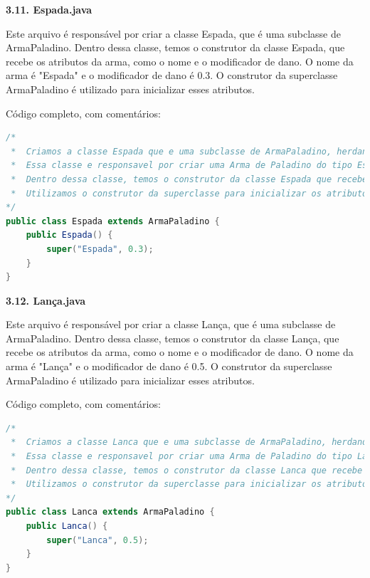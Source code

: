 \documentclass[11pt]{uiobrev}
\begin{document}
\vspace{0.5cm}
\Large \textbf{3.11. Espada.java}

Este arquivo é responsável por criar a classe Espada, que é uma subclasse de ArmaPaladino. Dentro dessa classe, temos o construtor da classe Espada, que recebe os atributos da arma, como o nome e o modificador de dano. O nome da arma é "Espada" e o modificador de dano é 0.3. O construtor da superclasse ArmaPaladino é utilizado para inicializar esses atributos.

Código completo, com comentários: 

\begin{lstlisting}[language=Java, caption={Classe Espada, subclasse de ArmaPaladino}]
/*
 *  Criamos a classe Espada que e uma subclasse de ArmaPaladino, herdando os atributos de ArmaPaladino.
 *  Essa classe e responsavel por criar uma Arma de Paladino do tipo Espada.
 *  Dentro dessa classe, temos o construtor da classe Espada que recebe o nome e o dano da arma.
 *  Utilizamos o construtor da superclasse para inicializar os atributos de ArmaPaladino.
*/
public class Espada extends ArmaPaladino {
    public Espada() {
        super("Espada", 0.3);
    }
}
\end{lstlisting}

\vspace{0.5cm}
\Large \textbf{3.12. Lança.java}

Este arquivo é responsável por criar a classe Lança, que é uma subclasse de ArmaPaladino. Dentro dessa classe, temos o construtor da classe Lança, que recebe os atributos da arma, como o nome e o modificador de dano. O nome da arma é "Lança" e o modificador de dano é 0.5. O construtor da superclasse ArmaPaladino é utilizado para inicializar esses atributos.

Código completo, com comentários: 

\begin{lstlisting}[language=Java, caption={Classe Lanca, subclasse de ArmaPaladino}]
/*
 *  Criamos a classe Lanca que e uma subclasse de ArmaPaladino, herdando os atributos de ArmaPaladino.
 *  Essa classe e responsavel por criar uma Arma de Paladino do tipo Lanca.
 *  Dentro dessa classe, temos o construtor da classe Lanca que recebe o nome e o dano da arma.
 *  Utilizamos o construtor da superclasse para inicializar os atributos de ArmaPaladino.
*/
public class Lanca extends ArmaPaladino {
    public Lanca() {
        super("Lanca", 0.5);
    }
}
\end{lstlisting}
\end{document}
